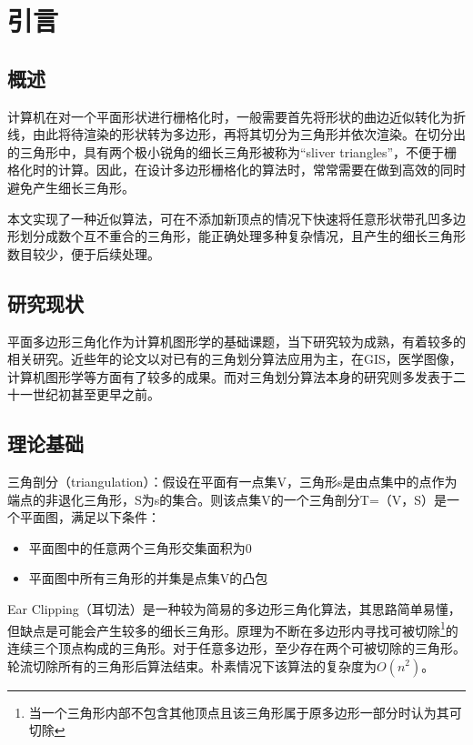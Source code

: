 
\chapter{引言}

\section{概述}
  计算机在对一个平面形状进行栅格化时，一般需要首先将形状的曲边近似转化为折线，由此将待渲染的形状转为多边形，再将其切分为三角形并依次渲染。在切分出的三角形中，具有两个极小锐角的细长三角形被称为“sliver triangles”，不便于栅格化时的计算。因此，在设计多边形栅格化的算法时，常常需要在做到高效的同时避免产生细长三角形。

  本文实现了一种近似算法，可在不添加新顶点的情况下快速将任意形状带孔凹多边形划分成数个互不重合的三角形，能正确处理多种复杂情况，且产生的细长三角形数目较少，便于后续处理。
\section{研究现状}

平面多边形三角化作为计算机图形学的基础课题，当下研究较为成熟，有着较多的相关研究。近些年的论文以对已有的三角划分算法应用为主，在GIS，医学图像，计算机图形学等方面有了较多的成果。而对三角划分算法本身的研究则多发表于二十一世纪初甚至更早之前。


\section{理论基础}
三角剖分（triangulation）：假设在平面有一点集V，三角形s是由点集中的点作为端点的非退化三角形，S为s的集合。则该点集V的一个三角剖分T=（V，S）是一个平面图，满足以下条件：
\begin{itemize}
  \item 平面图中的任意两个三角形交集面积为0
  \item 平面图中所有三角形的并集是点集V的凸包
\end{itemize}

Ear Clipping（耳切法）是一种较为简易的多边形三角化算法，其思路简单易懂，但缺点是可能会产生较多的细长三角形。原理为不断在多边形内寻找可被切除\footnote[1]{当一个三角形内部不包含其他顶点且该三角形属于原多边形一部分时认为其可切除}的连续三个顶点构成的三角形。对于任意多边形，至少存在两个可被切除的三角形。轮流切除所有的三角形后算法结束。朴素情况下该算法的复杂度为\(O(n^2)\)。

